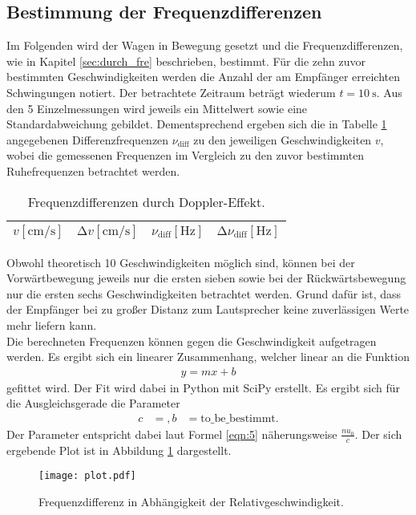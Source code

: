 \subsection{Bestimmung der Frequenzdifferenzen}
Im Folgenden wird der Wagen in Bewegung gesetzt und die Frequenzdifferenzen, wie in Kapitel \ref{sec:durch_fre} beschrieben, bestimmt.
Für die zehn zuvor bestimmten Geschwindigkeiten werden die Anzahl der am Empfänger erreichten Schwingungen notiert.
Der betrachtete Zeitraum beträgt wiederum $t = \SI{10}{\second}$.
Aus den 5 Einzelmessungen wird jeweils ein Mittelwert sowie eine Standardabweichung gebildet.
Dementsprechend ergeben sich die in Tabelle \ref{tab:diffe} angegebenen Differenzfrequenzen $\nu_{\text{diff}}$ zu den jeweiligen Geschwindigkeiten $v$, wobei die gemessenen Frequenzen im Vergleich zu den zuvor bestimmten Ruhefrequenzen betrachtet werden.
\begin{table}
  \centering
  \caption{Frequenzdifferenzen durch Doppler-Effekt.}
  \label{tab:diffe}
  \begin{tabular}{c c c c}
    \toprule
    {$v [\si{\centi\metre\per\second}]$} & {$\increment{v} [\si{\centi\metre\per\second}]$} & {$\nu_{\text{diff}} [\si{\hertz}]$} & {$\increment{\nu_{\text{diff}}} [\si{\hertz}]$}\\
    \midrule
    
    \bottomrule
  \end{tabular}
\end{table}
Obwohl theoretisch 10 Geschwindigkeiten möglich sind, können bei der Vorwärtbewegung jeweils nur die ersten sieben sowie bei der Rückwärtsbewegung nur die ersten sechs Geschwindigkeiten betrachtet werden.
Grund dafür ist, dass der Empfänger bei zu großer Distanz zum Lautsprecher keine zuverlässigen Werte mehr liefern kann.\\

Die berechneten Frequenzen können gegen die Geschwindigkeit aufgetragen werden.
Es ergibt sich ein linearer Zusammenhang, welcher linear an die Funktion
\begin{align*}
  y = m x + b
\end{align*}
gefittet wird.
Der Fit wird dabei in Python mit SciPy erstellt.
Es ergibt sich für die Ausgleichsgerade die Parameter
\begin{align*}
  c &= ,
  b &= \text{to_be_bestimmt}.
\end{align*}
Der Parameter entspricht dabei laut Formel \ref{eqn:5} näherungsweise $\frac{nu_0}{c}$.
Der sich ergebende Plot ist in Abbildung \ref{afig:1} dargestellt.
\begin{figure}
  \centering
  \texttt{[image: plot.pdf]}
  \caption{Frequenzdifferenz in Abhängigkeit der Relativgeschwindigkeit.}
  \label{afig:1}
\end{figure}

